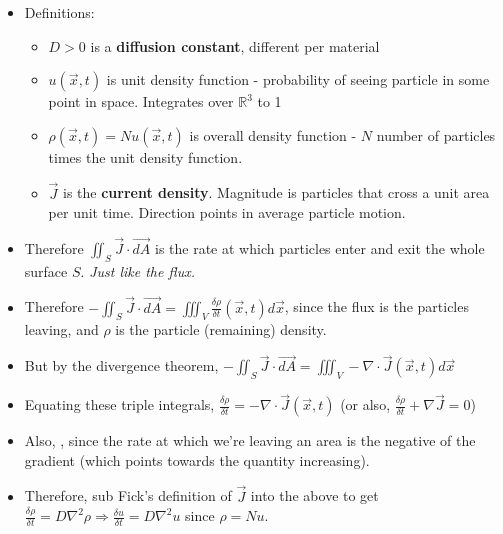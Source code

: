 \documentclass[11pt, oneside]{article}   	%
\begin{document}
\begin{itemize}
\item Definitions:
\begin{itemize}
\item $D > 0$ is a \textbf{diffusion constant}, different per material
\item $u(\vec{x},t)$ is unit density function - probability of seeing particle in some point in space.  Integrates over $\mathbb{R}^3$ to 1
\item $\rho(\vec{x},t) = Nu(\vec{x},t)$ is overall density function - $N$ number of particles times the unit density function.
\item $\vec{J}$ is the \textbf{current density}.  Magnitude is particles that cross a unit area per unit time.  Direction points in average particle motion.
\end{itemize}
\item Therefore $\iint_S \vec{J}\cdot \vec{dA}$ is the rate at which particles enter and exit the whole surface $S$.  \emph{Just like the flux.}
\item Therefore  $-\iint_S \vec{J}\cdot \vec{dA} = \iiint_V \frac{\delta \rho}{\delta t}(\vec{x}, t)d\vec{x}$, since the flux is the particles leaving, and $\rho$ is the particle (remaining) density.
\item But by the divergence theorem,  $-\iint_S \vec{J}\cdot \vec{dA} = \iiint_V - \nabla \cdot \vec{J}(\vec{x}, t)d\vec{x}$
\item Equating these triple integrals, $\frac{\delta \rho}{\delta t} = - \nabla \cdot \vec{J}(\vec{x}, t)$ (or also, $ \frac{\delta \rho}{\delta t}  + \nabla \vec{J} = 0$)
\item Also, , since the rate at which we're leaving an area is the negative of the gradient (which points towards the quantity increasing).
\item Therefore, sub Fick's definition of $\vec{J}$ into the above to get $\frac{\delta \rho}{\delta t} = D \nabla^2\rho \Rightarrow \frac{\delta u}{\delta t} = D \nabla^2u$ since $\rho = Nu$.
\end{itemize}
\end{document}

